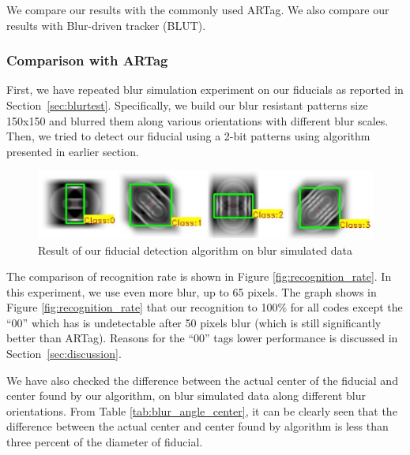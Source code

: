\documentclass[runningheads]{llncs}
\begin{document}
We compare our results with the commonly used ARTag. We also compare 
our results with Blur-driven tracker (BLUT)\cite{Wu:2011}.
\subsubsection{Comparison with ARTag}
First, we have repeated blur simulation experiment on our fiducials as reported
in Section~\ref{sec:blurtest}.  Specifically, we build our blur resistant
patterns size 150x150 and blurred them along various orientations with different
blur scales. Then, we tried to detect our fiducial using a 2-bit patterns using
algorithm presented in earlier section. 

\begin{figure}
\includegraphics[width=\linewidth]{blur_maximum.pdf}
\caption{Result of our fiducial detection algorithm on blur simulated data}
\label{fig:blur_maximum}
\end{figure}

The comparison of recognition rate is shown in Figure
\ref{fig:recognition_rate}. In this experiment, we use even more blur, up to 65
pixels.  The graph shows in Figure \ref{fig:recognition_rate} that our
recognition to 100\% for all codes except the ``00'' which has is undetectable
after 50 pixels blur (which is still significantly better than ARTag).  Reasons
for the ``00'' tags lower performance is discussed in Section~\ref{sec:discussion}.

We have also checked the difference between the actual center of the fiducial
and center found by our algorithm, on blur simulated data along different blur
orientations. From Table \ref{tab:blur_angle_center}, it can be clearly seen
that the difference between the actual center and center found by algorithm is
less than three percent of the diameter of fiducial. 
\end{document}
